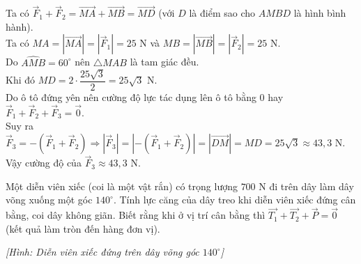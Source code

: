 \begin{bt}
{\begin{center}
		\end{center}
		Ta có $\overrightarrow{F}_1+\overrightarrow{F}_2=\overrightarrow{MA}+\overrightarrow{MB}=\overrightarrow{MD}$ (với  $D$ là điểm sao cho $AMBD$ là hình bình hành).\\
		 Ta có $MA=\left|\overrightarrow{MA}\right|=\left|\overrightarrow{F}_1\right|=25$ N và $MB=\left|\overrightarrow{MB}\right|=\left|\overrightarrow{F}_2\right|=25$ N.\\
		Do $\widehat{AMB}=60^{\circ}$  nên $\triangle MAB$ là tam giác đều. \\
		Khi đó $MD=2\cdot\dfrac{25\sqrt{3}}{2}=25\sqrt{3}$  N.\\
		Do ô tô đứng yên nên cường độ lực tác dụng lên ô tô bằng $0$ hay  $\overrightarrow{F}_1+\overrightarrow{F}_2+\overrightarrow{F}_3=\overrightarrow{0}$.\\
		Suy ra $\overrightarrow{F}_3=-\left(\overrightarrow{F}_1+\overrightarrow{F}_2\right)\Rightarrow\left|\overrightarrow{F}_3\right|=\left|-\left(\overrightarrow{F}_1+\overrightarrow{F}_2\right)\right|=\left|\overrightarrow{DM}\right|=MD=25\sqrt{3}\approx  43{,}3$ N.\\
	Vậy cường độ của $\overrightarrow{F}_3\approx  43{,}3$ N.}
\end{bt}

\begin{bt}%
	Một diễn viên xiếc (coi là một vật rắn) có trọng lượng $700$ N đi trên dây làm dây võng xuống một góc $140^\circ$. Tính lực căng của dây treo khi diễn viên xiếc đứng cân bằng, coi dây không giãn. Biết rằng khi ở vị trí cân bằng thì $\overrightarrow{T_1}+\overrightarrow{T_2}+\overrightarrow{P}=\overrightarrow{0}$ (kết quả làm tròn đến hàng đơn vị).
	\begin{center}\textit{[Hình: Diễn viên xiếc đứng trên dây võng góc $140^{\circ}$]}\end{center} %
\end{bt}

